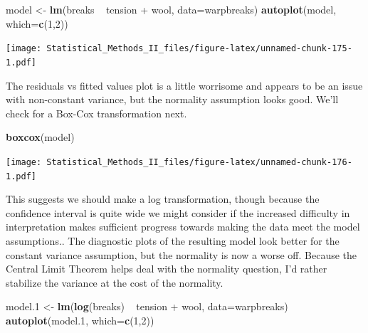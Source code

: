\documentclass[]{book}
\newenvironment{Shaded}{\begin{snugshade}}{\end{snugshade}}
\newcommand{\KeywordTok}[1]{\textcolor[rgb]{0.13,0.29,0.53}{\textbf{{#1}}}}
\newcommand{\DataTypeTok}[1]{\textcolor[rgb]{0.13,0.29,0.53}{{#1}}}
\newcommand{\DecValTok}[1]{\textcolor[rgb]{0.00,0.00,0.81}{{#1}}}
\newcommand{\FloatTok}[1]{\textcolor[rgb]{0.00,0.00,0.81}{{#1}}}
\newcommand{\StringTok}[1]{\textcolor[rgb]{0.31,0.60,0.02}{{#1}}}
\newcommand{\NormalTok}[1]{{#1}}
\theoremstyle{definition}
\theoremstyle{definition}
\theoremstyle{remark}
\begin{document}
\begin{Shaded}
\begin{Highlighting}[]
\NormalTok{model <-}\StringTok{ }\KeywordTok{lm}\NormalTok{(breaks ~}\StringTok{ }\NormalTok{tension +}\StringTok{ }\NormalTok{wool, }\DataTypeTok{data=}\NormalTok{warpbreaks)}
\KeywordTok{autoplot}\NormalTok{(model, }\DataTypeTok{which=}\KeywordTok{c}\NormalTok{(}\DecValTok{1}\NormalTok{,}\DecValTok{2}\NormalTok{))}
\end{Highlighting}
\end{Shaded}

\texttt{[image: Statistical\_Methods\_II\_files/figure-latex/unnamed-chunk-175-1.pdf]}

The residuals vs fitted values plot is a little worrisome and appears to
be an issue with non-constant variance, but the normality assumption
looks good. We'll check for a Box-Cox transformation next.

\begin{Shaded}
\begin{Highlighting}[]
\KeywordTok{boxcox}\NormalTok{(model)}
\end{Highlighting}
\end{Shaded}

\texttt{[image: Statistical\_Methods\_II\_files/figure-latex/unnamed-chunk-176-1.pdf]}

This suggests we should make a log transformation, though because the
confidence interval is quite wide we might consider if the increased
difficulty in interpretation makes sufficient progress towards making
the data meet the model assumptions.. The diagnostic plots of the
resulting model look better for the constant variance assumption, but
the normality is now a worse off. Because the Central Limit Theorem
helps deal with the normality question, I'd rather stabilize the
variance at the cost of the normality.

\begin{Shaded}
\begin{Highlighting}[]
\NormalTok{model}\FloatTok{.1} \NormalTok{<-}\StringTok{ }\KeywordTok{lm}\NormalTok{(}\KeywordTok{log}\NormalTok{(breaks) ~}\StringTok{ }\NormalTok{tension +}\StringTok{ }\NormalTok{wool, }\DataTypeTok{data=}\NormalTok{warpbreaks)}
\KeywordTok{autoplot}\NormalTok{(model}\FloatTok{.1}\NormalTok{, }\DataTypeTok{which=}\KeywordTok{c}\NormalTok{(}\DecValTok{1}\NormalTok{,}\DecValTok{2}\NormalTok{))}
\end{Highlighting}
\end{Shaded}
\end{document}
